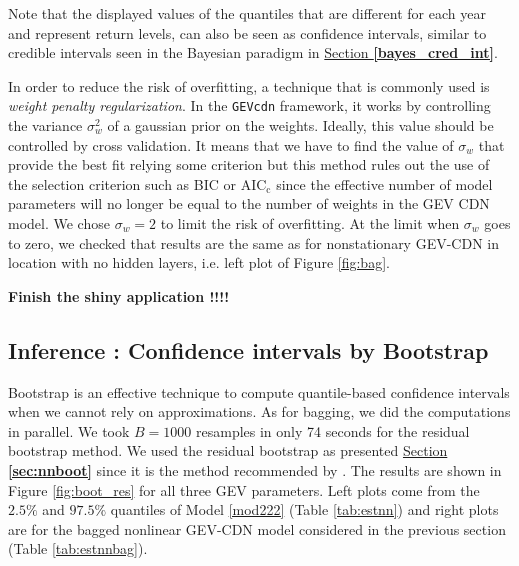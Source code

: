 Note that the displayed values of the quantiles that are different for each year and represent return levels, can also be seen as confidence intervals, similar to credible intervals seen in the Bayesian paradigm in \hyperref[bayes_cred_int]{Section \textbf{\ref{bayes_cred_int}}}.
 
  In order to reduce the risk of overfitting, a technique that is commonly used is  \emph{weight penalty regularization}. In the \texttt{GEVcdn} framework, it works by controlling the variance $\sigma^2_w$ of a gaussian prior on the weights. %
 Ideally, this value should be controlled by cross validation. It means that we have to find the value of $\sigma_w$ that provide the best fit relying some criterion but this method rules out the use of the selection criterion such as BIC or $\text{AIC}_{\text{c}}$ since the effective number of model parameters will no longer be equal to the number of weights in the GEV CDN model. We chose $\sigma_w=2$ to limit the risk of overfitting. At the limit when $\sigma_w$ goes to zero, we checked that results are the same as for nonstationary GEV-CDN in location with no hidden layers, i.e. left plot of Figure \ref{fig:bag}.
 
 
\textbf{ Finish the shiny application !!!! }
 
\subsection{Inference : Confidence intervals by Bootstrap }
 
 Bootstrap is an effective technique to compute quantile-based confidence intervals when we cannot rely on approximations.
As for bagging, we did the computations in parallel. 
We took $B= 1000$ resamples in only 74 seconds for the residual bootstrap method.
We used the residual bootstrap as presented  \hyperref[sec:nnboot]{Section \textbf{\ref{sec:nnboot}}} 
since it is the method recommended by \citet{kharin_estimating_2005}. The results are shown in Figure \ref{fig:boot_res} for all three GEV parameters. Left plots come from the $2.5\%$ and $97.5\%$ quantiles of Model \ref{mod222} (Table \ref{tab:estnn}) and right plots are for the bagged nonlinear GEV-CDN model considered in the previous section (Table \ref{tab:estnnbag}). 
 
